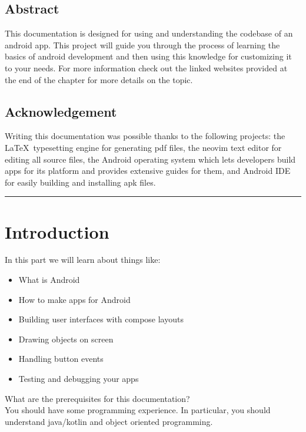 \documentclass[12pt,oneside]{book}
\begin{document}
\setcounter{tocdepth}{1}
\tableofcontents \newpage

\lhead{} \chead{} \rhead{}
\Large \centering
\section*{\Huge Abstract} 
This documentation is designed for using and understanding the codebase of an android app. This project will guide you through the process of learning the basics of android development and then using this knowledge for customizing it to your needs. For more information check out the linked websites provided at the end of the chapter for more details on the topic.
\vspace*{3\baselineskip}

\section*{\Huge Acknowledgement} 
Writing this documentation was possible thanks to the following projects: the \LaTeX\ typesetting engine for generating pdf files, the neovim text editor for editing all source files, the Android operating system which lets developers build apps for its platform and provides extensive guides for them, and Android IDE for easily building and installing apk files.

\vfill \rule{\textwidth}{0.4pt}
 \large \raggedright

\chapter{Introduction}
In this part we will learn about things like:
\begin{itemize}
    \item What is Android
    \item How to make apps for Android
    \item Building user interfaces with compose layouts
    \item Drawing objects on screen
    \item Handling button events
    \item Testing and debugging your apps
\end{itemize}
What are the prerequisites for this documentation? \\
You should have some programming experience. In particular, you should understand java/kotlin and object oriented programming.
\end{document}
